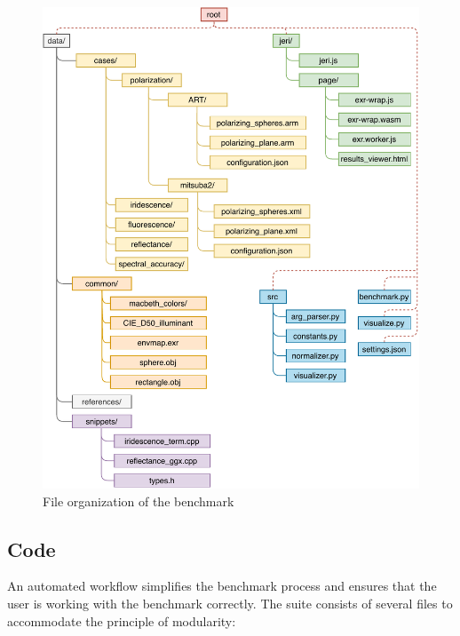 \begin{figure}
	\centering
	\includegraphics[width=\linewidth]{img/framework.pdf}
	\caption{File organization of the benchmark}
	\label{fig:framework}
\end{figure}

\subsection{Code}

An automated workflow simplifies the benchmark process and ensures that the user is working with the benchmark correctly. The suite consists of several files to accommodate the principle of modularity:

